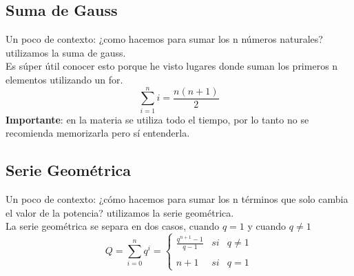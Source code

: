 \documentclass[10pt,a4paper]{article}
\begin{document}
\subsection*{Suma de Gauss}
Un poco de contexto: ¿como hacemos para sumar los n números naturales? utilizamos la suma de gauss. \\
Es súper útil conocer esto porque he visto lugares donde suman los primeros n elementos utilizando un for. \\
\[\sum_{i=1}^{n}{i} = \frac{n(n+1)}{2} \] 
\textbf{Importante}: en la materia se utiliza todo el tiempo, por lo tanto no se recomienda memorizarla pero sí entenderla.
\subsection*{Serie Geométrica}
Un poco de contexto: ¿cómo hacemos para sumar los n términos que solo cambia el valor de la potencia? utilizamos la serie geométrica. \\
La serie geométrica se separa en dos casos, cuando $q=1$ y cuando $q\neq 1$
\[Q = \sum_{i=0}^{n}{q^{i}} = \left\{ \begin{array}{lcc} \frac{q^{n+1}-1}{q-1} & si & q \neq 1 \\ \\ n+1 & si & q = 1 \end{array} \right.\]
\end{document}
